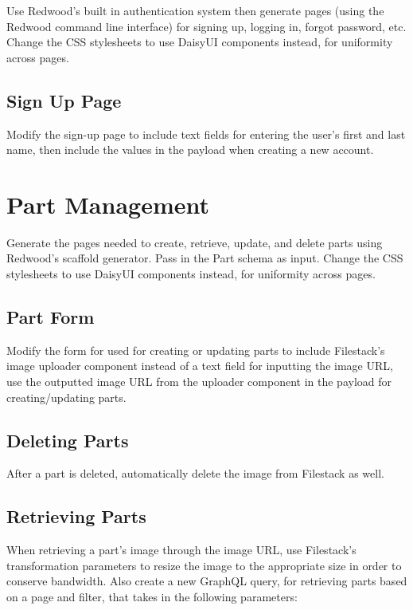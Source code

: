 \documentclass[12pt, letterpaper]{article}
\begin{document}
Use Redwood's built in authentication system then generate pages (using the Redwood command line interface) for signing up, logging in, forgot password, etc. Change the CSS stylesheets to use DaisyUI components instead, for uniformity across pages.

\subsection{Sign Up Page}

Modify the sign-up page to include text fields for entering the user's first and last name, then include the values in the payload when creating a new account.

\section{Part Management}

Generate the pages needed to create, retrieve, update, and delete parts using Redwood's scaffold generator. Pass in the Part schema as input. Change the CSS stylesheets to use DaisyUI components instead, for uniformity across pages.

\subsection{Part Form}

Modify the form for used for creating or updating parts to include Filestack's image uploader component instead of a text field for inputting the image URL, use the outputted image URL from the uploader component in the payload for creating/updating parts.

\subsection{Deleting Parts}

After a part is deleted, automatically delete the image from Filestack as well.

\subsection{Retrieving Parts}

When retrieving a part's image through the image URL, use Filestack's transformation parameters to resize the image to the appropriate size in order to conserve bandwidth. Also create a new GraphQL query, for retrieving parts based on a page and filter, that takes in the following parameters: \\
\end{document}
